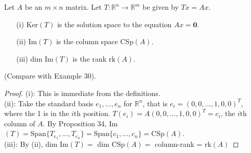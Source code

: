 \documentclass[twoside]{scrartcl}
\begin{document}
 
\begin{proposition}  Let $A$ be an $m \times n$ matrix. Let $T: \mathbb{R}^n \to \mathbb{R}^m$ be given by $Tx = Ax$. \begin{enumerate}
 \item[(i)] Ker$(T)$ is the solution space to the equation $Ax = \mathbf{0}$. 
 \item[(ii)] Im$(T)$ is the column space $\text{CSp}(A)$.
 \item[(iii)] dim Im$(T)$ is the rank $\text{rk}(A)$.
 \end{enumerate}
 
 (Compare with Example 30).
  \end{proposition}

 
 \begin{proof}
 (i): This is immediate from the definitions. \\
 
 (ii): Take the standard basis $e_1,\dots,e_n$ for $\mathbb{R}^n$, that is $e_i = (0,0,\dots,1,0,0)^T$, where the 1 is in the $i$th position. $T(e_i) = A(0,0,\dots,1,0,0)^T = c_i$, the $i$th column of $A$. By Proposition 34, Im$(T) = \text{Span}\{T_{e_1},\dots,T_{e_n}\} = \text{Span}\{c_1,\dots,c_n\} = \text{CSp}(A)$.\\
 
 (iii): By (ii), dim Im$(T) = $ dim $\text{CSp}(A) =$ column-rank = $\text{rk}(A)$
 \end{proof}\vspace*{10pt}
\end{document}

